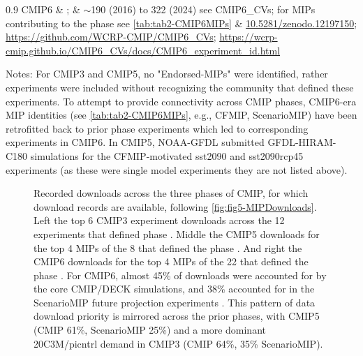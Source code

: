 \documentclass[manuscript]{copernicus}
\def\cred#1{{\color{red}#1}}
\begin{document}
\begin{table}[htp]
{\begin{tabularx}{0.9\textwidth}
			CMIP6 & \citet{eyring_overview_2016}; \citet{durack_cmip6_2024} & $\sim$190 (2016) to 322 (2024) see CMIP6\_CVs; for MIPs contributing to the phase see \autoref{tab:tab2-CMIP6MIPs} & \href{http://doi.org/10.5281/zenodo.12197150}{10.5281/zenodo.12197150}; \url{https://github.com/WCRP-CMIP/CMIP6\_CVs}; \url{https://wcrp-cmip.github.io/CMIP6\_CVs/docs/CMIP6\_experiment\_id.html}\\
			\hline		
		\end{tabularx}
	} %
	\label{tab:tabAppA1-MIPExperiments}
	\footnotesize{Notes: For CMIP3 and CMIP5, no "Endorsed-MIPs" were identified, rather experiments were included without recognizing the community that defined these experiments. To attempt to provide connectivity across CMIP phases, CMIP6-era MIP identities (see \autoref{tab:tab2-CMIP6MIPs}, e.g., CFMIP, ScenarioMIP) have been retrofitted back to prior phase experiments which led to corresponding experiments in CMIP6. In CMIP5, NOAA-GFDL submitted GFDL-HIRAM-C180 simulations for the CFMIP-motivated sst2090 and sst2090rcp45 experiments (as these were single model experiments they are not listed above).}
\end{table}


\begin{figure}
    \centering
    
    \caption{Recorded downloads across the three phases of CMIP, for which download records are available, following \autoref{fig:fig5-MIPDownloads}. Left the top 6 CMIP3 experiment downloads across the 12 experiments that defined phase \citep{meehl_wcrp_2007}. Middle the CMIP5 downloads for the top 4 MIPs of the 8 that defined the phase \citep[\autoref{tab:tabAppA1-MIPExperiments};][]{taylor_overview_2012}. And right the CMIP6 downloads for the top 4 MIPs of the 22 that defined the phase \cite[[see \autoref{tab:tab2-CMIP6MIPs};][]{eyring_overview_2016}. For CMIP6, almost 45\% of downloads were accounted for by the core CMIP/DECK simulations, and 38\% accounted for in the ScenarioMIP future projection experiments \citep{oneill_scenario_2016}. This pattern of data download priority is mirrored across the prior phases, with CMIP5 (CMIP 61\%, ScenarioMIP 25\%) and a more dominant 20C3M/picntrl demand in CMIP3 (CMIP 64\%, 35\% ScenarioMIP).}
    \label{fig:figA1-MIPDownloads}
\end{figure}
\end{document}
